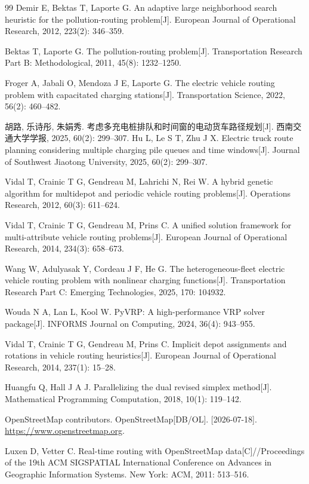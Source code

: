 \documentclass{setp-new}
\begin{document}
\begin{thebibliography}{99}
 Demir E, Bektas T, Laporte G. An adaptive large neighborhood search heuristic for the pollution-routing problem[J]. European Journal of Operational Research, 2012, 223(2): 346--359.

 Bektas T, Laporte G. The pollution-routing problem[J]. Transportation Research Part B: Methodological, 2011, 45(8): 1232--1250.

 Froger A, Jabali O, Mendoza J E, Laporte G. The electric vehicle routing problem with capacitated charging stations[J]. Transportation Science, 2022, 56(2): 460--482.

 胡路, 乐诗彤, 朱娟秀. 考虑多充电桩排队和时间窗的电动货车路径规划[J]. 西南交通大学学报, 2025, 60(2): 299--307.\newline
Hu L, Le S T, Zhu J X. Electric truck route planning considering multiple charging pile queues and time windows[J]. Journal of Southwest Jiaotong University, 2025, 60(2): 299--307.

 Vidal T, Crainic T G, Gendreau M, Lahrichi N, Rei W. A hybrid genetic algorithm for multidepot and periodic vehicle routing problems[J]. Operations Research, 2012, 60(3): 611--624.

 Vidal T, Crainic T G, Gendreau M, Prins C. A unified solution framework for multi-attribute vehicle routing problems[J]. European Journal of Operational Research, 2014, 234(3): 658--673.

 Wang W, Adulyasak Y, Cordeau J F, He G. The heterogeneous-fleet electric vehicle routing problem with nonlinear charging functions[J]. Transportation Research Part C: Emerging Technologies, 2025, 170: 104932.

 Wouda N A, Lan L, Kool W. PyVRP: A high-performance VRP solver package[J]. INFORMS Journal on Computing, 2024, 36(4): 943--955.

 Vidal T, Crainic T G, Gendreau M, Prins C. Implicit depot assignments and rotations in vehicle routing heuristics[J]. European Journal of Operational Research, 2014, 237(1): 15--28.

 Huangfu Q, Hall J A J. Parallelizing the dual revised simplex method[J]. Mathematical Programming Computation, 2018, 10(1): 119--142.

 OpenStreetMap contributors. OpenStreetMap[DB/OL]. [2026-07-18]. \url{https://www.openstreetmap.org}.

 Luxen D, Vetter C. Real-time routing with OpenStreetMap data[C]//Proceedings of the 19th ACM SIGSPATIAL International Conference on Advances in Geographic Information Systems. New York: ACM, 2011: 513--516.


\end{thebibliography}
\end{document}
